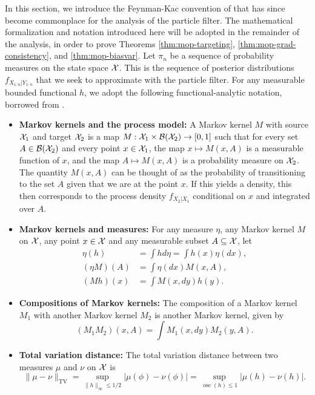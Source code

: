 

In this section, we introduce the Feynman-Kac convention of \cite{delMoral04} that has since become commonplace \cite{karjalainen23} for the analysis of the particle filter. The mathematical formalization and notation introduced here will be adopted in the remainder of the analysis, in order to prove Theorems \ref{thm:mop-targeting}, \ref{thm:mop-grad-consistency}, and \ref{thm:mop-biasvar}. Let $\pi_n$ be a sequence of probability measures on the state space ${\mathcal{X}}$. This is the sequence of posterior distributions $f_{X_{1:n}|Y_{1:n}}$ that we seek to approximate with the particle filter. For any measurable bounded functional $h$, we adopt the following functional-analytic notation, borrowed from \cite{delMoral04, chopin20, karjalainen23}. 

\begin{itemize}
\item \textbf{Markov kernels and the process model:} A Markov kernel $M$ with source ${\mathcal{X}}_1$ and target ${\mathcal{X}}_2$ is a map $M: {\mathcal{X}}_1 \times \mathcal{B}({\mathcal{X}}_2) \to [0,1]$ such that for every set $A \in \mathcal{B}({\mathcal{X}}_2)$ and every point $x \in {\mathcal{X}}_1$, the map $x \mapsto M(x, A)$ is a measurable function of $x$, and the map $A \mapsto M(x,A)$ is a probability measure on ${\mathcal{X}}_2$. The quantity $M(x,A)$ can be thought of as the probability of transitioning to the set $A$ given that we are at the point $x$. If this yields a density, this then corresponds to the process density $f_{X_{2}|X_1}$ conditional on $x$ and integrated over $A$.  
\item \textbf{Markov kernels and measures:} For any measure $\eta$, any Markov kernel $M$ on ${\mathcal{X}}$, any point $x \in {\mathcal{X}}$ and any measurable subset $A \subseteq {\mathcal{X}}$, let 
\begin{align*}
    \eta(h) &= \int h d\eta = \int h(x) \eta(dx), \\(\eta M)(A) &= \int \eta(dx)M(x,A), \\
    (Mh)(x) &= \int M(x, dy) h(y).
\end{align*}
\item \textbf{Compositions of Markov kernels:} The composition of a Markov kernel $M_1$ with another Markov kernel $M_2$ is another Markov kernel, given by 
$$(M_1M_2)(x, A) = \int M_1(x, dy) M_2(y, A).$$
\item \textbf{Total variation distance:} The total variation distance between two measures $\mu$ and $\nu$ on ${\mathcal{X}}$ is
$$\|\mu-\nu\|_{\mathrm{TV}}=\sup _{\|h\|_{\infty} \leq 1 / 2}|\mu(\phi)-\nu(\phi)|=\sup _{\operatorname{osc}(h) \leq 1}|\mu(h)-\nu(h)|.$$

\end{itemize}

